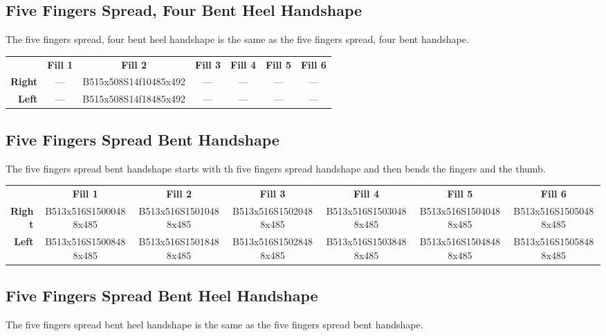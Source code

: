 \documentclass{article}
\begin{document}
\subsection{Five Fingers Spread, Four Bent Heel Handshape}

The five fingers spread, four bent heel handshape is the same as the five fingers spread, four bent handshape.

\begin{center}
\begin{tabular}{r*{6}{c}}
&\textbf{Fill 1}&\textbf{Fill 2}&\textbf{Fill 3}&\textbf{Fill 4}&\textbf{Fill 5}&\textbf{Fill 6}\\
\textbf{Right}&
---&
B515x508S14f10485x492&
---&
---&
---&
---\\
\textbf{Left}&
---&
B515x508S14f18485x492&
---&
---&
---&
---\\
\end{tabular}
\end{center}

\subsection{Five Fingers Spread Bent Handshape}

The five fingers spread bent handshape starts with th five fingers spread handshape and then bends the fingers and the thumb.

\begin{center}
\begin{tabular}{r*{6}{c}}
&\textbf{Fill 1}&\textbf{Fill 2}&\textbf{Fill 3}&\textbf{Fill 4}&\textbf{Fill 5}&\textbf{Fill 6}\\
\textbf{Right}&
B513x516S15000488x485&
B513x516S15010488x485&
B513x516S15020488x485&
B513x516S15030488x485&
B513x516S15040488x485&
B513x516S15050488x485\\
\textbf{Left}&
B513x516S15008488x485&
B513x516S15018488x485&
B513x516S15028488x485&
B513x516S15038488x485&
B513x516S15048488x485&
B513x516S15058488x485\\
\end{tabular}
\end{center}

\subsection{Five Fingers Spread Bent Heel Handshape}

The five fingers spread bent heel handshape is the same as the five fingers spread bent handshape.
\end{document}
